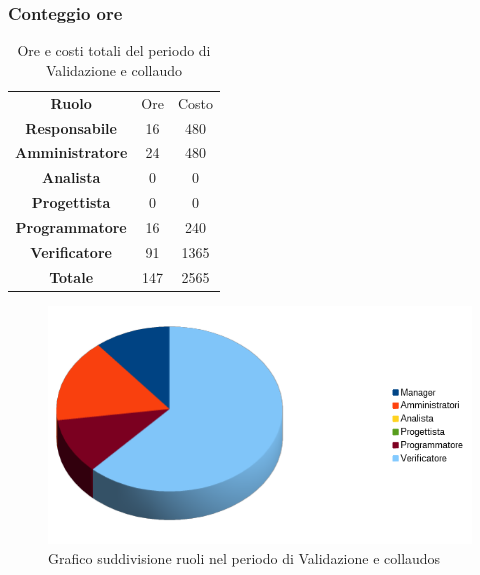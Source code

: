 	\subsubsection{Conteggio ore}
	\begin{table}[h!]
		\centering
		\renewcommand{\arraystretch}{2} 
		\begin{tabular}{| c c c|}
			\rowcolor{orange!50}
			\hline
			\multicolumn{3}{|c|}{\textbf{Suddivisione ruoli in ore}}\\
			\hline
			\textbf{Ruolo} 			& Ore 	& Costo\\
			\hline
			\textbf{Responsabile}	&16		&480\\
			\hline
			\textbf{Amministratore}	&24		&480\\
			\hline
			\textbf{Analista}		&0		&0\\
			\hline
			\textbf{Progettista}	&0		&0\\
			\hline
			\textbf{Programmatore}	&16		&240\\
			\hline
			\textbf{Verificatore} 	&91		&1365\\
			\hline
			\textbf{Totale} 		&147	&2565\\
			\hline 
		\end{tabular}
		\caption{Ore e costi totali del periodo di Validazione e collaudo}
	\end{table}

\begin{figure}[h!]
	\centering
	\includegraphics[width=\textwidth]{preventivo/torta_quarta_parte.png}
	\caption{Grafico suddivisione ruoli nel periodo di Validazione e collaudos}
\end{figure}
	